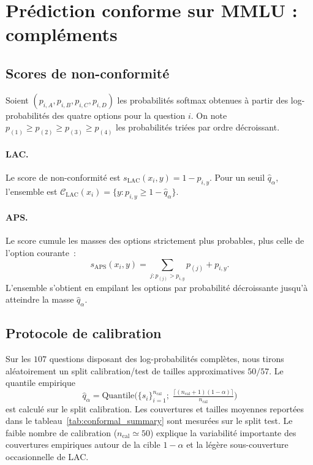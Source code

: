 \documentclass[12pt,a4paper]{article}
\begin{document}
\bigskip

{\small

}

\bigskip

{\small

}

\section{Prédiction conforme sur MMLU : compléments}
\label{ann:conformal}

\subsection{Scores de non-conformité}

Soient $(p_{i,A}, p_{i,B}, p_{i,C}, p_{i,D})$ les probabilités softmax obtenues à partir des log-probabilités des quatre options pour la question $i$. On note $p_{(1)} \geq p_{(2)} \geq p_{(3)} \geq p_{(4)}$ les probabilités triées par ordre décroissant.

\paragraph{LAC.} Le score de non-conformité est $s_{\text{LAC}}(x_i, y) = 1 - p_{i,y}$. Pour un seuil $\hat{q}_\alpha$, l'ensemble est $\mathcal{C}_{\text{LAC}}(x_i) = \{y : p_{i,y} \geq 1 - \hat{q}_\alpha\}$.

\paragraph{APS.} Le score cumule les masses des options strictement plus probables, plus celle de l'option courante~:
\[
s_{\text{APS}}(x_i, y) = \sum_{j : p_{(j)} > p_{i,y}} p_{(j)} + p_{i,y}.
\]
L'ensemble s'obtient en empilant les options par probabilité décroissante jusqu'à atteindre la masse $\hat{q}_\alpha$.

\subsection{Protocole de calibration}

Sur les $107$ questions disposant des log-probabilités complètes, nous tirons aléatoirement un split calibration/test de tailles approximatives $50/57$. Le quantile empirique
\[
\hat{q}_\alpha = \text{Quantile}\Big(\{s_i\}_{i=1}^{n_{\text{cal}}};\; \tfrac{\lceil (n_{\text{cal}}+1)(1-\alpha)\rceil}{n_{\text{cal}}}\Big)
\]
est calculé sur le split calibration. Les couvertures et tailles moyennes reportées dans le tableau~\ref{tab:conformal_summary} sont mesurées sur le split test. Le faible nombre de calibration ($n_{\text{cal}} \simeq 50$) explique la variabilité importante des couvertures empiriques autour de la cible $1-\alpha$ et la légère sous-couverture occasionnelle de LAC.
\end{document}
